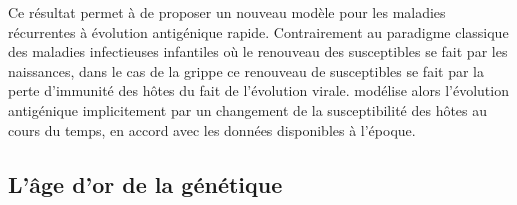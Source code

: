 Ce résultat permet à \citet{Pease1987} de proposer un nouveau modèle
pour les maladies récurrentes à évolution antigénique rapide.
Contrairement au paradigme classique des maladies infectieuses
infantiles où le renouveau des susceptibles se fait par les
naissances, dans le cas de la grippe ce renouveau de susceptibles se
fait par la perte d'immunité des hôtes du fait de l'évolution virale.
\citet{Pease1987} modélise alors l'évolution antigénique implicitement
par un changement de la susceptibilité des hôtes au cours du temps, en
accord avec les données disponibles à l'époque.


\subsection{L'âge d'or de la génétique}

